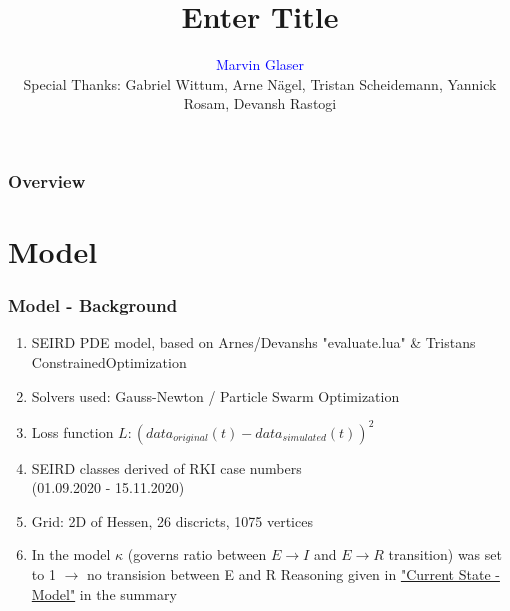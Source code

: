 \documentclass{beamer}
\title[Other thing]{Enter Title}
\author{\textcolor{blue}{Marvin Glaser\\}
\vspace{2mm}\footnotesize{Special Thanks: Gabriel Wittum, Arne N\"agel, Tristan Scheidemann, Yannick Rosam, Devansh Rastogi}} %
\institute[G-CSC] %
{
Goethe Universtiy Frankfurt - Center for Scientific Computing \\ %
\medskip
}
\begin{document}



\begin{frame}
\frametitle{Overview} 
\tableofcontents 
\end{frame}






\section{Model}
\begin{frame}
	\frametitle{Model - Background}
	\begin{enumerate}[$\bullet$]
		\item SEIRD PDE model, based on Arnes/Devanshs "evaluate.lua" \& Tristans ConstrainedOptimization
		\item Solvers used: Gauss-Newton / Particle Swarm Optimization
		\item Loss function $L: (data_{original}(t) - data_{simulated}(t))^2 $
		\item SEIRD classes derived of RKI case numbers\\(01.09.2020 - 15.11.2020)
		\item Grid: 2D of Hessen, 26 discricts, 1075 vertices
		\item In the model $\kappa$ (governs ratio between $E\rightarrow I$ and $E\rightarrow R$ transition) was set to 1
			$\rightarrow$ no transision between E and R
			Reasoning given in \hyperlink{sec:StateModel}{"Current State - Model"} in the summary
	\end{enumerate}

\end{frame}
\end{document}
